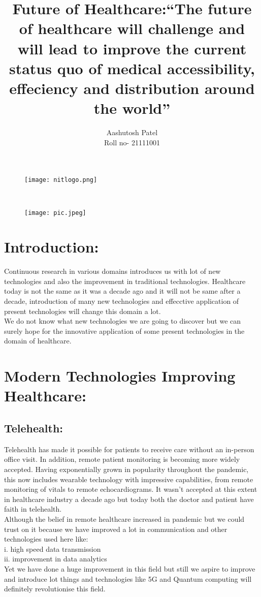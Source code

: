 \documentclass[a4paper,12pt]{article}
\author{Aashutosh Patel \\ Roll no- 21111001}
\begin{document}
	\begin{figure}
		\centering
		\texttt{[image: nitlogo.png]}
	\end{figure}
	\maketitle
	\clearpage
	
	{\huge \centering \title{Future of Healthcare:}}
	\\
	{\title{“The future of healthcare will challenge and will lead to improve the current status quo of medical accessibility, effeciency and distribution around the world”}}

\begin{figure}[h]       
	\texttt{[image: pic.jpeg]}
\end{figure} 
\section{Introduction:}

Continuous research in various domains introduces us with lot of new technologies and also the improvement in traditional technologies. Healthcare today is not the same as it was a decade ago and it will not be same after a decade, introduction of many new technologies and effecctive application of present technologies will change this domain a lot.
\\
We do not know what new technologies we are going to discover but we can surely hope for the innovative application of some present technologies in the domain of healthcare.
\section{Modern Technologies Improving Healthcare:}

\subsection{Telehealth:}
Telehealth has made it possible for patients to receive care without an in-person office visit. In addition, remote patient monitoring is becoming more widely accepted. Having exponentially grown in popularity throughout the pandemic, this now includes wearable technology with impressive capabilities, from remote monitoring of vitals to remote echocardiograms. It wasn't accepted at this extent in healthcare industry a decade ago but today both the doctor and patient have faith in telehealth.
\\
Although the belief in remote healthcare increased in pandemic but we could trust on it because we have improved a lot in communication and other technologies used here like:
\\
i. high speed data transmission
\\
ii. improvement in data analytics
\\
Yet we have done a huge improvement in this field but still we aspire to improve and introduce lot things and technologies like 5G and Quantum computing will definitely revolutionise this field.
\\
\end{document}

